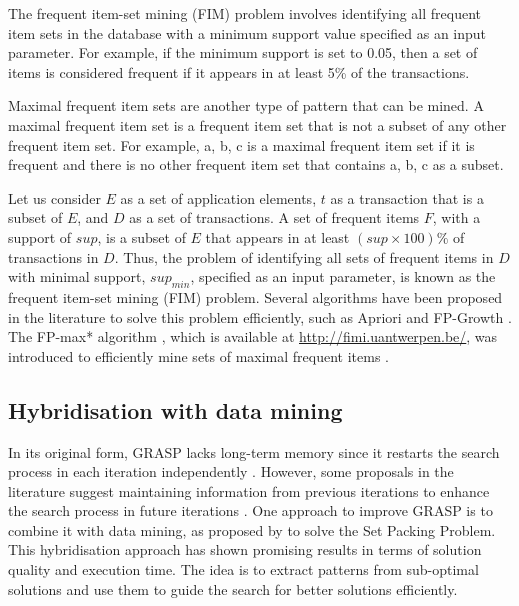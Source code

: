 \documentclass{singlecol-new}
\begin{document}
The frequent item-set mining (FIM) problem involves identifying all frequent item sets in the database with a minimum support value specified as an input parameter. For example, if the minimum support is set to 0.05, then a set of items is considered frequent if it appears in at least 5\% of the transactions.

Maximal frequent item sets are another type of pattern that can be mined. A maximal frequent item set is a frequent item set that is not a subset of any other frequent item set. For example, {a, b, c} is a maximal frequent item set if it is frequent and there is no other frequent item set that contains {a, b, c} as a subset.



Let us consider $E$ as a set of application elements, $t$ as a transaction that is a subset of $E$, and $D$ as a set of transactions. A set of frequent items $F$, with a support of $sup$, is a subset of $E$ that appears in at least $(sup \times 100)\%$ of transactions in $D$. Thus, the problem of identifying all sets of frequent items in $D$ with minimal support, $sup_{min}$, specified as an input parameter, is known as the frequent item-set mining (FIM) problem. Several algorithms have been proposed in the literature to solve this problem efficiently, such as Apriori \cite{agrawal1994fast} and FP-Growth \cite{han2000mining}. The FP-max* algorithm \cite{goethals04}, which is available at \url{http://fimi.uantwerpen.be/}, was introduced to efficiently mine sets of maximal frequent items \cite{grahne2003efficiently}.
	
\subsection{Hybridisation with data mining}


In its original form, GRASP lacks long-term memory since it restarts the search process in each iteration independently \cite{aloise2011adaptive}. However, some proposals in the literature suggest maintaining information from previous iterations to enhance the search process in future iterations \cite{fleurent1999improved, italo, rochat1995probabilistic, plastino2011hybrid, plastino2014adaptive, ribeiro2006hybridization}. One approach to improve GRASP is to combine it with data mining, as proposed by \citet{ribeiro2006hybridization} to solve the Set Packing Problem. This hybridisation approach has shown promising results in terms of solution quality and execution time. The idea is to extract patterns from sub-optimal solutions and use them to guide the search for better solutions efficiently.
\end{document}
